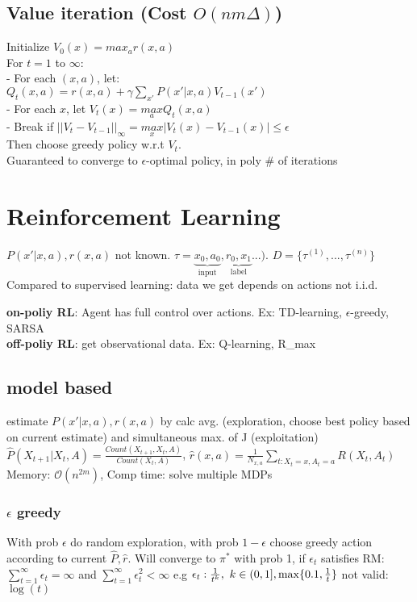 \subsection{Value iteration (Cost $O(nm\Delta)$)}
Initialize $V_0(x)=max_a r(x,a)$\\
For $t=1$ to $\infty$:\\
- For each $(x,a)$, let: \\
$Q_t(x,a)=r(x,a)+\gamma\sum_{x'}P(x'|x,a)V_{t-1}(x')$\\
- For each $x$, let $V_t(x)=\underset{a}{max}Q_t(x,a)$\\
- Break if $||V_t-V_{t-1}||_{\infty}=\underset{x}{max}|V_t(x)-V_{t-1}(x)|\leq\epsilon$\\
Then choose greedy policy w.r.t $V_t$.\\
Guaranteed to converge to $\epsilon$-optimal policy, in poly \# of iterations

\section{Reinforcement Learning}
$P(x'|x,a), r(x,a)$ not known. $\tau = \underbrace{x_{0}, a_{0}}_{\text{input}},
\underbrace{r_{0}, x_{1}}_{\text{label}}...)$. $D=\{\tau^{(1)}, ..., \tau^{(n )}\}$
Compared to supervised learning: data we get depends on actions \textrightarrow not i.i.d.

\textbf{on-poliy RL}: Agent has full control over actions.
Ex: TD-learning, $\epsilon$-greedy, SARSA\\
\textbf{off-poliy RL}: get observational data. Ex: Q-learning, R_max

\subsection{model based}
estimate $P(x'|x,a), r(x,a)$ by calc avg. (exploration, choose best policy based on current estimate)
and simultaneous max. of J (exploitation)
$\hat{P}(X_{t+1}|X_{t},A) = \frac{Count(X_{t+1}, X_{t}, A)}{Count(X_t, A)}$,
$\hat{r}(x,a) = \frac{1}{N_{x,a}} \sum_{t:X_{t}=x, A_t=a} R(X_t, A_t)$\\

Memory: $\mathcal{O}(n^{2m})$, Comp time: solve multiple MDPs

\subsubsection{$\epsilon$ greedy}
With prob $\epsilon$ do random exploration, with prob $1-\epsilon$ choose greedy action according to current
$\hat{P}, \hat{r}$.
Will converge to $\pi^{*}$ with prob 1, if $\epsilon_{t}$ satisfies \color{magenta}RM:\color{black}
$\sum_{t=1}^{\infty}\epsilon_{t} = \infty$ and $\sum_{t=1}^{\infty}\epsilon_{t}^{2} < \infty$
e.g $\epsilon_{t}:\frac{1}{t^{k}},\ k \in (0,1],\max\cset{0.1,\frac{1}{t}}$ not valid: $\log(t)$


